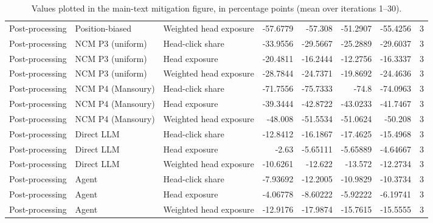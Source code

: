 \begin{table}[htbp!]
\begin{tabular}{lllrrrrr}
Post-processing & Position-biased & Weighted head exposure & -57.6779 & -57.308 & -51.2907 & -55.4256 & 3 \\
Post-processing & NCM P3 (uniform) & Head-click share & -33.9556 & -29.5667 & -25.2889 & -29.6037 & 3 \\
Post-processing & NCM P3 (uniform) & Head exposure & -20.4811 & -16.2444 & -12.2756 & -16.3337 & 3 \\
Post-processing & NCM P3 (uniform) & Weighted head exposure & -28.7844 & -24.7371 & -19.8692 & -24.4636 & 3 \\
Post-processing & NCM P4 (Mansoury) & Head-click share & -71.7556 & -75.7333 & -74.8 & -74.0963 & 3 \\
Post-processing & NCM P4 (Mansoury) & Head exposure & -39.3444 & -42.8722 & -43.0233 & -41.7467 & 3 \\
Post-processing & NCM P4 (Mansoury) & Weighted head exposure & -48.008 & -51.5534 & -51.0624 & -50.208 & 3 \\
Post-processing & Direct LLM & Head-click share & -12.8412 & -16.1867 & -17.4625 & -15.4968 & 3 \\
Post-processing & Direct LLM & Head exposure & -2.63 & -5.65111 & -5.65889 & -4.64667 & 3 \\
Post-processing & Direct LLM & Weighted head exposure & -10.6261 & -12.622 & -13.572 & -12.2734 & 3 \\
Post-processing & Agent & Head-click share & -7.93692 & -12.2005 & -10.9829 & -10.3734 & 3 \\
Post-processing & Agent & Head exposure & -4.06778 & -8.60222 & -5.92222 & -6.19741 & 3 \\
Post-processing & Agent & Weighted head exposure & -12.9176 & -17.9874 & -15.7615 & -15.5555 & 3 \\
\hline
\end{tabular}
\caption{Values plotted in the main-text mitigation figure, in percentage points (mean over iterations 1--30).}
\label{chap:results:tab:main_rq4_mitigation_effects_values}
\end{table}
